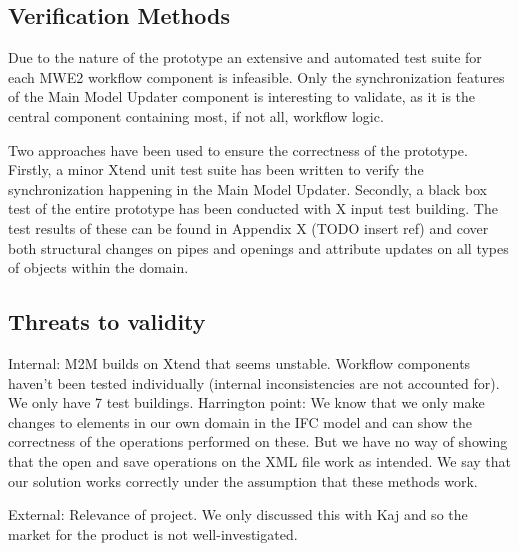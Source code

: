 \subsection{Verification Methods}
\label{subsec:verification_methods}
Due to the nature of the prototype an extensive and automated test suite for each MWE2 workflow component is infeasible. Only the synchronization features of the Main Model Updater component is interesting to validate, as it is the central component containing most, if not all, workflow logic.

Two approaches have been used to ensure the correctness of the prototype. Firstly, a minor Xtend unit test suite has been written to verify the synchronization happening in the Main Model Updater. Secondly, a black box test of the entire prototype has been conducted with X input test building. The test results of these can be found in Appendix X (TODO insert ref) and cover both structural changes on pipes and openings and attribute updates on all types of objects within the domain.

\subsection{Threats to validity}
Internal:
M2M builds on Xtend that seems unstable.
Workflow components haven't been tested individually (internal inconsistencies are not accounted for). We only have 7 test buildings.
Harrington point: We know that we only make changes to elements in our own domain in the IFC model and can show the correctness of the operations performed on these. But we have no way of showing that the open and save operations on the XML file work as intended. We say that our solution works correctly under the assumption that these methods work.

External:
Relevance of project. We only discussed this with Kaj and so the market for the product is not well-investigated.


